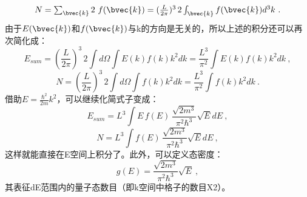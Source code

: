 \begin{equation}
N=\textstyle \sum_{\bvec{k}}2\ f(\bvec{k})=(\frac{L}{2\pi})^3\,2 \int_{\bvec{k}}f(\bvec{k})d^3k~.
\end{equation}
由于$E(\bvec{k})$和$f(\bvec{k})$与k的方向是无关的，所以上述的积分还可以再次简化成：
\begin{equation}
E_{sum}=(\frac{L}{2\pi})^3\,2\int d\Omega \int E(k)f(k)k^2dk=\frac{L^3}{\pi^2} \int E(k)f(k)k^2dk~,
\end{equation}
\begin{equation}
N=(\frac{L}{2\pi})^3\,2\int d\Omega \int f(k)k^2dk=\frac{L^3}{\pi^2}\int f(k)k^2dk~.
\end{equation}
借助$E=\frac{\hbar^2}{2m}k^2$，可以继续化简式子变成：
\begin{equation}
E_{sum}=L^3 \int E\,f(E)\,\frac{\sqrt{2m^3}}{\pi^2\hbar^3}\sqrt{E}dE~,
\end{equation}
\begin{equation}
N=L^3 \int f(E)\,\frac{\sqrt{2m^3}}{\pi^2\hbar^3}\sqrt{E}dE~,
\end{equation}
这样就能直接在E空间上积分了。此外，可以定义态密度：
\begin{equation}
g(E)=\frac{\sqrt{2m^3}}{\pi^2\hbar^3}\sqrt{E}~,
\end{equation}
其表征dE范围内的量子态数目（即k空间中格子的数目X2）。

